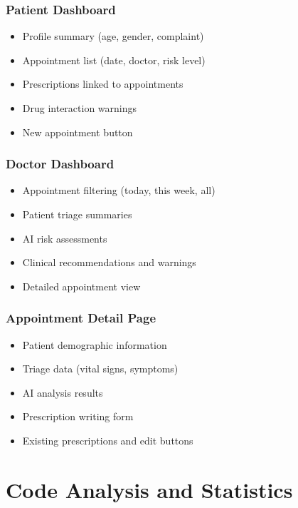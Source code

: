 \documentclass[12pt,a4paper]{article}
\begin{document}
\subsubsection{Patient Dashboard}
\begin{itemize}
    \item Profile summary (age, gender, complaint)
    \item Appointment list (date, doctor, risk level)
    \item Prescriptions linked to appointments
    \item Drug interaction warnings
    \item New appointment button
\end{itemize}

\subsubsection{Doctor Dashboard}
\begin{itemize}
    \item Appointment filtering (today, this week, all)
    \item Patient triage summaries
    \item AI risk assessments
    \item Clinical recommendations and warnings
    \item Detailed appointment view
\end{itemize}

\subsubsection{Appointment Detail Page}
\begin{itemize}
    \item Patient demographic information
    \item Triage data (vital signs, symptoms)
    \item AI analysis results
    \item Prescription writing form
    \item Existing prescriptions and edit buttons
\end{itemize}

\section{Code Analysis and Statistics}
\end{document}
